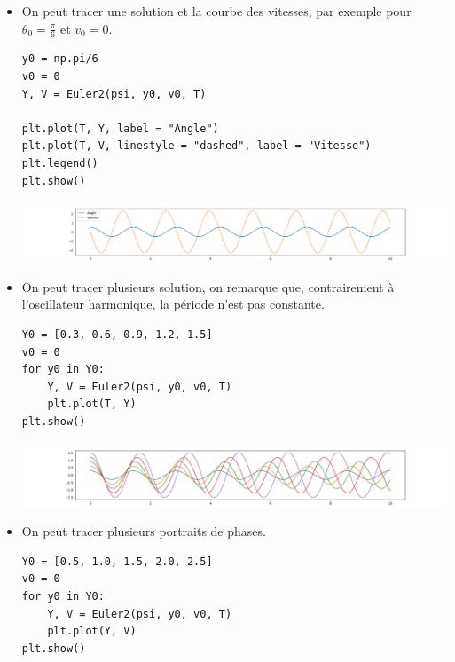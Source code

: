 \begin{itemize}
    \item On peut tracer une solution et la courbe des vitesses, par exemple pour $\theta_0 = \frac \pi 6$ et $v_0=0$.
\begin{lstlisting}
y0 = np.pi/6
v0 = 0
Y, V = Euler2(psi, y0, v0, T)

plt.plot(T, Y, label = "Angle")
plt.plot(T, V, linestyle = "dashed", label = "Vitesse")
plt.legend()
plt.show()
\end{lstlisting}
\begin{center}
\includegraphics[width=14cm]{Cours/Images/ED2_pendule1.png}
\end{center}
\item On peut tracer plusieurs solution, on remarque que, contrairement à l'oscillateur harmonique, la période n'est pas constante.
\begin{lstlisting}
Y0 = [0.3, 0.6, 0.9, 1.2, 1.5]
v0 = 0
for y0 in Y0:
    Y, V = Euler2(psi, y0, v0, T)
    plt.plot(T, Y)
plt.show()
\end{lstlisting}
\begin{center}
\includegraphics[width=14cm]{Cours/Images/ED2_pendule2.png}
\end{center}
\item On peut tracer plusieurs portraits de phases.
\begin{lstlisting}
Y0 = [0.5, 1.0, 1.5, 2.0, 2.5]
v0 = 0
for y0 in Y0:
    Y, V = Euler2(psi, y0, v0, T)
    plt.plot(Y, V)
plt.show()

\end{lstlisting}
\end{itemize}
